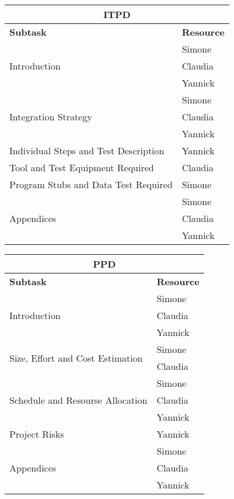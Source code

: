 \vspace* {30px}

\begin{center}
\begin{tabular}{ |l|l| }
	\multicolumn{2}{c}{\textbf{ITPD}} \\ \hline
	\textbf{Subtask} & \textbf{Resource} \\ \hline
	\multirow{3}{*}{Introduction} & Simone \\ 
				& Claudia \\
				& Yannick \\ \hline
	\multirow{3}{*}{Integration Strategy} & Simone \\ 
									& Claudia \\
									& Yannick \\ \hline
	\multirow{1}{*}{Individual Steps and Test Description} & Yannick \\ \hline
	\multirow{1}{*}{ Tool and Test Equipment Required } & Claudia \\ \hline
	\multirow{1}{*}{Program Stubs and Data Test Required} & Simone \\ \hline
	\multirow{3}{*}{Appendices} & Simone \\ 
				& Claudia \\
				& Yannick \\ \hline

\end{tabular}
\end{center}

\vspace* {30px}

\begin{center}
\begin{tabular}{ |l|l| }
	\multicolumn{2}{c}{\textbf{PPD}} \\ \hline
	\textbf{Subtask} & \textbf{Resource} \\ \hline
	\multirow{3}{*}{Introduction} & Simone \\ 
				& Claudia \\
				& Yannick \\ \hline
	\multirow{2}{*}{Size, Effort and Cost Estimation} & Simone \\ 
									& Claudia \\ \hline
	\multirow{3}{*}{Schedule and Resourse Allocation} & Simone \\ 
				& Claudia \\
				& Yannick \\ \hline
	\multirow{1}{*}{Project Risks} & Yannick \\ \hline
	\multirow{3}{*}{Appendices} & Simone \\ 
				& Claudia \\
				& Yannick \\ \hline

\end{tabular}
\end{center}


